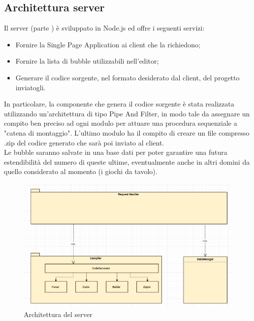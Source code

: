 \documentclass[../PianoDiQualifica.tex]{subfiles}
\begin{document}
		\subsection{Architettura server}
			Il server (parte ) è sviluppato in Node.js ed offre i seguenti servizi:
			\begin{itemize}
				\item Fornire la Single Page Application ai client che la richiedono;
				\item Fornire la lista di bubble utilizzabili nell'editor;
				\item Generare il codice sorgente, nel formato desiderato dal client, del progetto
				inviatogli.
			\end{itemize}
			In particolare, la componente che genera il codice sorgente è stata realizzata utilizzando
			un'architettura di tipo Pipe And Filter, in modo tale da assegnare un compito ben preciso
			ad ogni modulo per attuare una procedura sequenziale a "catena di montaggio". L'ultimo
			modulo ha il compito di creare un file compresso .zip del codice generato che sarà poi
			inviato al client.\\
			Le bubble saranno salvate in una base dati per poter garantire una futura estendibilità del
			numero di queste ultime, eventualmente anche in altri domini da quello considerato al
			momento (i giochi da tavolo).
			\begin{figure}[H]\label{fig:ServerSubsystem}
				\centering
				\includegraphics[scale=0.7]{Immagini/DiagrammaArchitettura/ServerSubsystem.png}
				\caption{Architettura del server}
			\end{figure}
\end{document}
